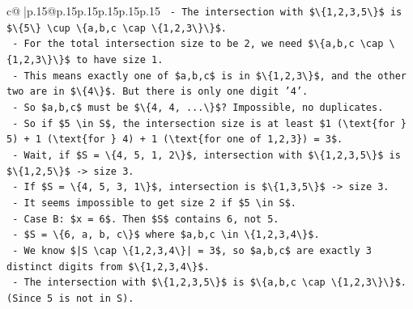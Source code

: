 \documentclass{article}
\begin{document}
{\begin{supertabular}{c@{$\;$}|p{.15\linewidth}@{}p{.15\linewidth}p{.15\linewidth}p{.15\linewidth}p{.15\linewidth}p{.15\linewidth}}
{{{\texttt{        {-} The intersection with \$\textbackslash{}\{1,2,3,5\textbackslash{}\}\$ is \$\textbackslash{}\{5\textbackslash{}\} \textbackslash{}cup \textbackslash{}\{a,b,c \textbackslash{}cap \textbackslash{}\{1,2,3\textbackslash{}\}\textbackslash{}\}\$.} \\
\texttt{        {-} For the total intersection size to be 2, we need \$\textbackslash{}\{a,b,c \textbackslash{}cap \textbackslash{}\{1,2,3\textbackslash{}\}\textbackslash{}\}\$ to have size 1.} \\
\texttt{        {-} This means exactly one of \$a,b,c\$ is in \$\textbackslash{}\{1,2,3\textbackslash{}\}\$, and the other two are in \$\textbackslash{}\{4\textbackslash{}\}\$. But there is only one digit '4'.} \\
\texttt{        {-} So \$a,b,c\$ must be \$\textbackslash{}\{4, 4, ...\textbackslash{}\}\$? Impossible, no duplicates.} \\
\texttt{        {-} So if \$5 \textbackslash{}in S\$, the intersection size is at least \$1 (\textbackslash{}text\{for \} 5) + 1 (\textbackslash{}text\{for \} 4) + 1 (\textbackslash{}text\{for one of 1,2,3\}) = 3\$.} \\
\texttt{        {-} Wait, if \$S = \textbackslash{}\{4, 5, 1, 2\textbackslash{}\}\$, intersection with \$\textbackslash{}\{1,2,3,5\textbackslash{}\}\$ is \$\textbackslash{}\{1,2,5\textbackslash{}\}\$ {-}> size 3.} \\
\texttt{        {-} If \$S = \textbackslash{}\{4, 5, 3, 1\textbackslash{}\}\$, intersection is \$\textbackslash{}\{1,3,5\textbackslash{}\}\$ {-}> size 3.} \\
\texttt{        {-} It seems impossible to get size 2 if \$5 \textbackslash{}in S\$.} \\
\texttt{      {-} Case B: \$x = 6\$. Then \$S\$ contains 6, not 5.} \\
\texttt{        {-} \$S = \textbackslash{}\{6, a, b, c\textbackslash{}\}\$ where \$a,b,c \textbackslash{}in \textbackslash{}\{1,2,3,4\textbackslash{}\}\$.} \\
\texttt{        {-} We know \$|S \textbackslash{}cap \textbackslash{}\{1,2,3,4\textbackslash{}\}| = 3\$, so \$a,b,c\$ are exactly 3 distinct digits from \$\textbackslash{}\{1,2,3,4\textbackslash{}\}\$.} \\
\texttt{        {-} The intersection with \$\textbackslash{}\{1,2,3,5\textbackslash{}\}\$ is \$\textbackslash{}\{a,b,c \textbackslash{}cap \textbackslash{}\{1,2,3\textbackslash{}\}\textbackslash{}\}\$. (Since 5 is not in S).} \\
}}}
\end{supertabular}}
\end{document}
